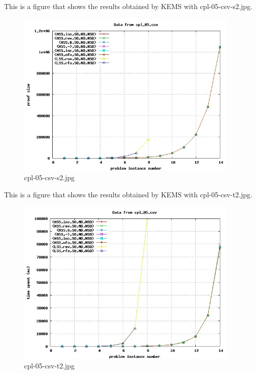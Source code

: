 This is a figure that shows the results obtained by KEMS with cpl-05-csv-s2.jpg.
\begin{figure}[htbp]
\begin{center}
\includegraphics[width=0.95\textwidth]{figuras/cpl-05-csv-s2.jpg}
\end{center}
\caption{cpl-05-csv-s2.jpg}
\end{figure}

This is a figure that shows the results obtained by KEMS with cpl-05-csv-t2.jpg.
\begin{figure}[htbp]
\begin{center}
\includegraphics[width=0.95\textwidth]{figuras/cpl-05-csv-t2.jpg}
\end{center}
\caption{cpl-05-csv-t2.jpg}
\end{figure}

